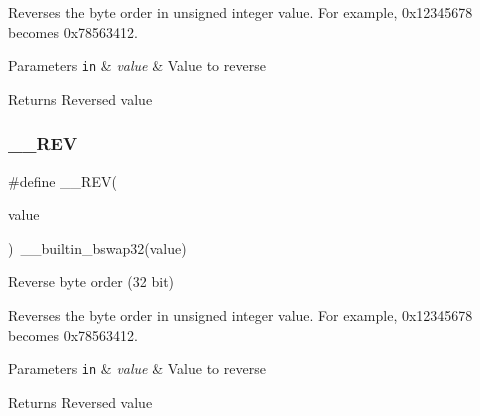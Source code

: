 Reverses the byte order in unsigned integer value. For example, 0x12345678 becomes 0x78563412. 
\begin{DoxyParams}[1]{Parameters}
\mbox{\tt in}  & {\em value} & Value to reverse \\
\hline
\end{DoxyParams}
\begin{DoxyReturn}{Returns}
Reversed value 
\end{DoxyReturn}
\mbox{\label{group___c_m_s_i_s___core___instruction_interface_gaca25a02e09983da5558f5242f2f635bc}} 
\subsubsection{\texorpdfstring{\+\_\+\+\_\+\+R\+EV}{\_\_REV}\hspace{0.1cm}{\footnotesize\ttfamily [2/2]}}
{\footnotesize\ttfamily \#define \+\_\+\+\_\+\+R\+EV(\begin{DoxyParamCaption}\item[{}]{value }\end{DoxyParamCaption})~\+\_\+\+\_\+builtin\+\_\+bswap32(value)}



Reverse byte order (32 bit) 

Reverses the byte order in unsigned integer value. For example, 0x12345678 becomes 0x78563412. 
\begin{DoxyParams}[1]{Parameters}
\mbox{\tt in}  & {\em value} & Value to reverse \\
\hline
\end{DoxyParams}
\begin{DoxyReturn}{Returns}
Reversed value 
\end{DoxyReturn}
\mbox{\label{group___c_m_s_i_s___core___instruction_interface_gad35497777af37e7809271b5e6f9510ba}} 
